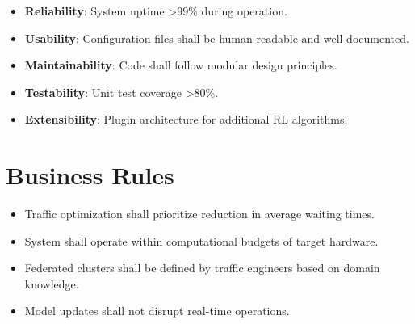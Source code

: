 \begin{itemize}
\item \textbf{Reliability}: System uptime >99\% during operation.
\item \textbf{Usability}: Configuration files shall be human-readable and well-documented.
\item \textbf{Maintainability}: Code shall follow modular design principles.
\item \textbf{Testability}: Unit test coverage >80\%.
\item \textbf{Extensibility}: Plugin architecture for additional RL algorithms.
\end{itemize}

\section{Business Rules}

\begin{itemize}
\item Traffic optimization shall prioritize reduction in average waiting times.
\item System shall operate within computational budgets of target hardware.
\item Federated clusters shall be defined by traffic engineers based on domain knowledge.
\item Model updates shall not disrupt real-time operations.
\end{itemize}